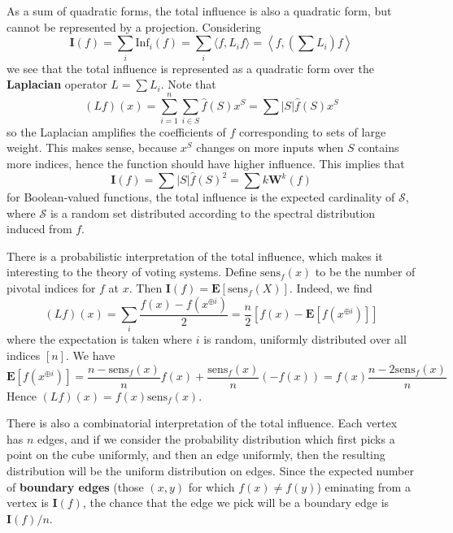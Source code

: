 As a sum of quadratic forms, the total influence is also a quadratic form, but cannot be represented by a projection. Considering
%
\[ \mathbf{I}(f) = \sum_i \text{Inf}_i(f) = \sum_i \langle f, L_i f \rangle = \left\langle f, \left( \sum L_i \right) f \right\rangle \]
%
we see that the total influence is represented as a quadratic form over the {\bf Laplacian} operator $L = \sum L_i$. Note that
%
\[ (Lf)(x) = \sum_{i = 1}^n \sum_{i \in S} \widehat{f}(S) x^S = \sum |S| \widehat{f}(S) x^S \]
%
so the Laplacian amplifies the coefficients of $f$ corresponding to sets of large weight. This makes sense, because $x^S$ changes on more inputs when $S$ contains more indices, hence the function should have higher influence. This implies that
%
\[ \mathbf{I}(f) = \sum |S| \widehat{f}(S)^2 = \sum k \mathbf{W}^k(f) \]
%
for Boolean-valued functions, the total influence is the expected cardinality of $\mathcal{S}$, where $\mathcal{S}$ is a random set distributed according to the spectral distribution induced from $f$.

There is a probabilistic interpretation of the total influence, which makes it interesting to the theory of voting systems. Define $\text{sens}_f(x)$ to be the number of pivotal indices for $f$ at $x$. Then $\mathbf{I}(f) = \mathbf{E}[\text{sens}_f(X)]$. Indeed, we find
%
\[ (Lf)(x) = \sum_i \frac{f(x) - f(x^{\oplus i})}{2} = \frac{n}{2} [f(x) - \mathbf{E}[f(x^{\oplus i})]] \]
%
where the expectation is taken where $i$ is random, uniformly distributed over all indices $[n]$. We have
%
\[ \mathbf{E}[f(x^{\oplus i})] = \frac{n - \text{sens}_f(x)}{n} f(x) + \frac{\text{sens}_f(x)}{n} (-f(x)) = f(x) \frac{n - 2 \text{sens}_f(x)}{n} \]
%
Hence $(Lf)(x) = f(x) \text{sens}_f(x)$.

There is also a combinatorial interpretation of the total influence. Each vertex has $n$ edges, and if we consider the probability distribution which first picks a point on the cube uniformly, and then an edge uniformly, then the resulting distribution will be the uniform distribution on edges. Since the expected number of {\bf boundary edges} (those $(x,y)$ for which $f(x) \neq f(y)$) eminating from a vertex is $\mathbf{I}(f)$, the chance that the edge we pick will be a boundary edge is $\mathbf{I}(f)/n$.


